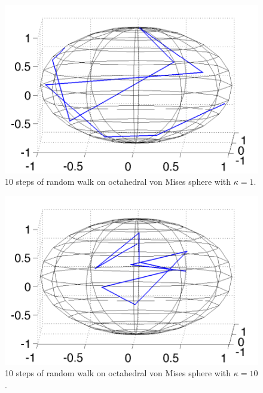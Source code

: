 \documentclass[11pt]{article}
\begin{document}
\begin{figure}[h!]
\centering
\includegraphics[scale=0.35]{../fig/vm-walk__k_1__t_10.pdf}
\caption{10 steps of random walk on octahedral von Mises sphere with $\kappa=1$.}
\label{fig:vm-walk__k_1__t_10}
\end{figure}

\begin{figure}[h!]
\centering
\includegraphics[scale=0.35]{../fig/vm-walk__k_10__t_10.pdf}
\caption{10 steps of random walk on octahedral von Mises sphere with $\kappa=10$.}
\label{fig:vm-walk__k_10__t_10}
\end{figure}
\end{document}
